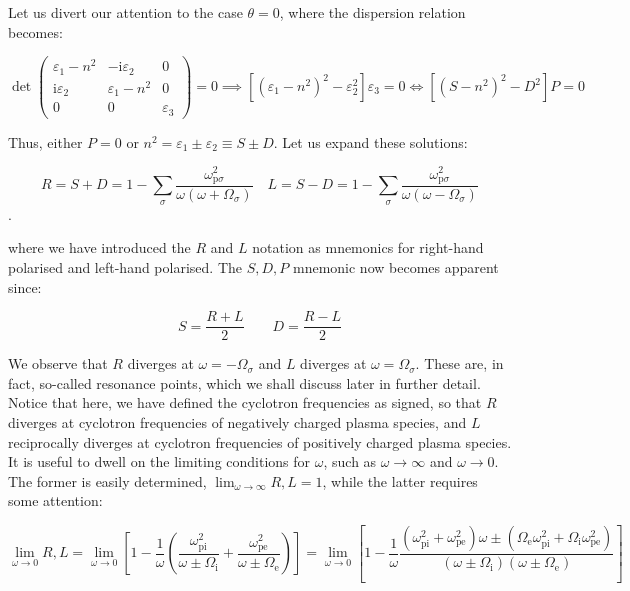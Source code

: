 Let us divert our attention to the case $\theta=0$, where the dispersion relation becomes:

\begin{equation}
    \det{\begin{pmatrix}
        \varepsilon_1-n^2 & -\mathrm{i}\varepsilon_2 & 0\\
        \mathrm{i}\varepsilon_2 & \varepsilon_1-n^2 & 0\\
        0 & 0 & \varepsilon_3
    \end{pmatrix}}=0\implies\left[(\varepsilon_1-n^2)^2-\varepsilon_2^2\right]\varepsilon_3=0\Longleftrightarrow\left[(S-n^2)^2-D^2\right]P=0
\end{equation}

Thus, either $P=0$ or $n^2=\varepsilon_1\pm\varepsilon_2\equiv S\pm D$. Let us expand these solutions:

\begin{equation}
    R=S+D=1-\sum_\sigma\frac{\omega_{\mathrm{p}\sigma}^2}{\omega(\omega+\Omega_\sigma)}\quad L=S-D=1-\sum_\sigma\frac{\omega_{\mathrm{p}\sigma}^2}{\omega(\omega-\Omega_\sigma)}
\end{equation}.

where we have introduced the $R$ and $L$ notation as mnemonics for right-hand polarised and left-hand polarised. The $S,D,P$ mnemonic now becomes apparent since:

\begin{equation}
    S=\frac{R+L}{2}\qquad D=\frac{R-L}{2}
\end{equation}

We observe that $R$ diverges at $\omega=-\Omega_\sigma$ and $L$ diverges at $\omega=\Omega_\sigma$. These are, in fact, so-called resonance points, which we shall discuss later in further detail. Notice that here, we have defined the cyclotron frequencies as signed, so that $R$ diverges at cyclotron frequencies of negatively charged plasma species, and $L$ reciprocally diverges at cyclotron frequencies of positively charged plasma species. It is useful to dwell on the limiting conditions for $\omega$, such as $\omega\to\infty$ and $\omega\to0$. The former is easily determined, $\lim_{\omega\to\infty}R,L=1$, while the latter requires some attention:

\begin{equation}
    \lim_{\omega\to0}R,L=\lim_{\omega\to0}\left[1-\frac{1}{\omega}\left(\frac{\omega_\text{pi}^2}{\omega\pm\Omega_\mathrm{i}}+\frac{\omega_\text{pe}^2}{\omega\pm\Omega_\text{e}}\right)\right]=\lim_{\omega\to0}\left[1-\frac{1}{\omega}\frac{(\omega_\text{pi}^2+\omega_\text{pe}^2)\omega\pm(\Omega_\text{e}\omega_\text{pi}^2+\Omega_\mathrm{i}\omega_\text{pe}^2)}{(\omega\pm\Omega_\mathrm{i})(\omega\pm\Omega_\text{e})}\right]
\end{equation}

